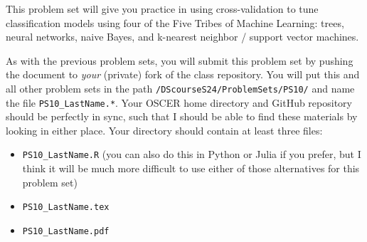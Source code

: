 \documentclass[12pt,english]{exam}
\begin{document}
This problem set will give you practice in using cross-validation to tune classification models using four of the Five Tribes of Machine Learning: trees, neural networks, naive Bayes, and k-nearest neighbor / support vector machines.

As with the previous problem sets, you will submit this problem set by pushing the document to \emph{your} (private) fork of the class repository. You will put this and all other problem sets in the path \texttt{/DScourseS24/ProblemSets/PS10/} and name the file \texttt{PS10\_LastName.*}. Your OSCER home directory and GitHub repository should be perfectly in sync, such that I should be able to find these materials by looking in either place. Your directory should contain at least three files:
\begin{itemize}
    \item \texttt{PS10\_LastName.R} (you can also do this in Python or Julia if you prefer, but I think it will be much more difficult to use either of those alternatives for this problem set)
    \item \texttt{PS10\_LastName.tex}
    \item \texttt{PS10\_LastName.pdf}
\end{itemize}
\end{document}
